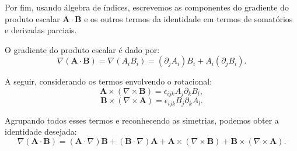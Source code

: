 \documentclass[a4paper,12pt]{article}
\begin{document}
\begin{flushleft}
\begin{itemize}
        Por fim, usando álgebra de índices, escrevemos as componentes do gradiente do produto escalar \( \mathbf{A} \cdot \mathbf{B} \) e os outros termos da identidade em termos de somatórios e derivadas parciais.
        
        O gradiente do produto escalar é dado por:
        \begin{equation}
        \nabla (\mathbf{A} \cdot \mathbf{B}) = \nabla (A_i B_i) = (\partial_j A_i) B_i + A_i (\partial_j B_i).
        \end{equation}
        
        A seguir, considerando os termos envolvendo o rotacional:
        \begin{equation}
        \mathbf{A} \times (\nabla \times \mathbf{B}) = \epsilon_{ijk} A_j \partial_k B_l,
        \end{equation}
        \begin{equation}
        \mathbf{B} \times (\nabla \times \mathbf{A}) = \epsilon_{ijk} B_j \partial_k A_l.
        \end{equation}
        
        Agrupando todos esses termos e reconhecendo as simetrias, podemos obter a identidade desejada:
        \begin{equation}
        \nabla (\mathbf{A} \cdot \mathbf{B}) = (\mathbf{A} \cdot \nabla) \mathbf{B} + (\mathbf{B} \cdot \nabla) \mathbf{A} + \mathbf{A} \times (\nabla \times \mathbf{B}) + \mathbf{B} \times (\nabla \times \mathbf{A}).
        \end{equation}
    \end{itemize}
\end{flushleft}
\end{document}
